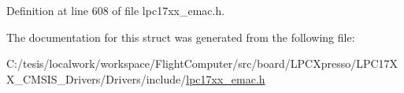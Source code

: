 \-Definition at line 608 of file lpc17xx\-\_\-emac.\-h.



\-The documentation for this struct was generated from the following file\-:\begin{DoxyCompactItemize}
\item 
\-C\-:/tesis/localwork/workspace/\-Flight\-Computer/src/board/\-L\-P\-C\-Xpresso/\-L\-P\-C17\-X\-X\-\_\-\-C\-M\-S\-I\-S\-\_\-\-Drivers/\-Drivers/include/\hyperlink{lpc17xx__emac_8h}{lpc17xx\-\_\-emac.\-h}\end{DoxyCompactItemize}

